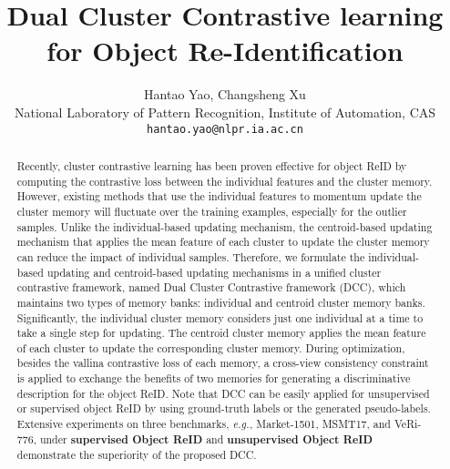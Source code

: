 \documentclass[10pt,twocolumn,letterpaper]{article}
\begin{document}
\title{Dual Cluster Contrastive learning for Object Re-Identification}

\author{Hantao Yao, Changsheng Xu\\
National Laboratory of Pattern Recognition, Institute of Automation, CAS\\
{\tt\small hantao.yao@nlpr.ia.ac.cn}
}
\maketitle

\begin{abstract}
Recently, cluster contrastive learning has been proven effective for object ReID by computing the contrastive loss between the individual features and the cluster memory.
However, existing methods that use the individual features to momentum update the cluster memory will fluctuate over the training examples, especially for the outlier samples.  
Unlike the individual-based updating mechanism, the centroid-based updating mechanism that applies the mean feature of each cluster to update the cluster memory can reduce the impact of individual samples.   
Therefore, we formulate the individual-based updating and centroid-based updating mechanisms in a unified cluster contrastive framework, named Dual Cluster Contrastive framework (DCC), which maintains two types of memory banks: individual and centroid cluster memory banks.
Significantly, the individual cluster memory considers just one individual at a time to take a single step for updating.
The centroid cluster memory applies the mean feature of each cluster to update the corresponding cluster memory.
During optimization, besides the vallina contrastive loss of each memory, a cross-view consistency constraint is applied to exchange the benefits of two memories for generating a discriminative description for the object ReID.
Note that DCC can be easily applied for unsupervised or supervised object ReID by using ground-truth labels or the generated pseudo-labels. 
Extensive experiments on three benchmarks, \emph{e.g.,} Market-1501, MSMT17, and VeRi-776, under \textbf{supervised Object ReID} and \textbf{unsupervised Object ReID} demonstrate the superiority of the proposed DCC.
\end{abstract}
\end{document}
